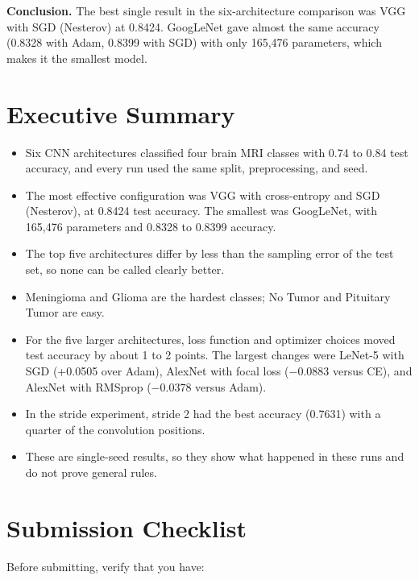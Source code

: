 \documentclass[12pt,a4paper]{article}
\begin{document}
\textbf{Conclusion.} The best single result in the six-architecture comparison was VGG with SGD (Nesterov) at
0.8424. GoogLeNet gave almost the same accuracy (0.8328 with Adam, 0.8399 with SGD) with only 165,476 parameters,
which makes it the smallest model.

\section*{Executive Summary}

\begin{itemize}[leftmargin=*]
  \item Six CNN architectures classified four brain MRI classes with 0.74 to 0.84 test accuracy, and every run
        used the same split, preprocessing, and seed.
  \item The most effective configuration was VGG with cross-entropy and SGD (Nesterov), at 0.8424 test accuracy.
        The smallest was GoogLeNet, with 165,476 parameters and 0.8328 to 0.8399 accuracy.
  \item The top five architectures differ by less than the sampling error of the test set, so none can be called
        clearly better.
  \item Meningioma and Glioma are the hardest classes; No Tumor and Pituitary Tumor are easy.
  \item For the five larger architectures, loss function and optimizer choices moved test accuracy by about 1 to 2
        points. The largest changes were LeNet-5 with SGD (+0.0505 over Adam), AlexNet with focal loss
        ($-0.0883$ versus CE), and AlexNet with RMSprop ($-0.0378$ versus Adam).
  \item In the stride experiment, stride 2 had the best accuracy (0.7631) with a quarter of the convolution positions.
  \item These are single-seed results, so they show what happened in these runs and do not prove general rules.
\end{itemize}

\section*{Submission Checklist}

Before submitting, verify that you have:
\end{document}
